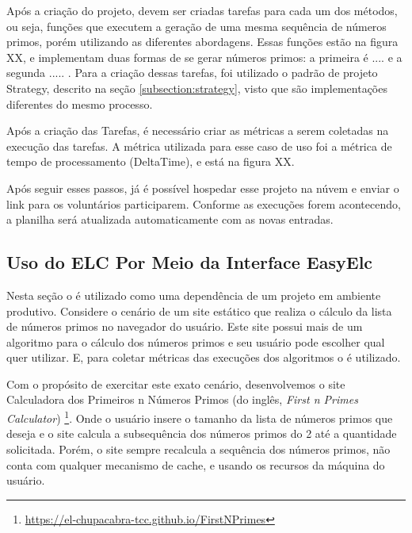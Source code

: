\documentclass[12pt]{tcc}
\begin{document}
Após a criação do projeto, devem ser criadas tarefas para cada um dos métodos, ou seja, funções que executem a geração de uma mesma sequência de números primos, porém utilizando as diferentes abordagens. Essas funções estão na figura XX, e implementam duas formas de se gerar números primos: a primeira é ....  e a segunda ..... . Para a criação dessas tarefas, foi utilizado o padrão de projeto Strategy, descrito na seção \ref{subsection:strategy}, visto que são implementações diferentes do mesmo processo.

Após a criação das Tarefas, é necessário criar as métricas a serem coletadas na execução das tarefas. A métrica utilizada para esse caso de uso foi a métrica de tempo de processamento (DeltaTime), e está na figura XX.

Após seguir esses passos, já é possível hospedar esse projeto na núvem e enviar o link para os voluntários participarem. Conforme as execuções forem acontecendo, a planilha será atualizada automaticamente com as novas entradas.


\subsection{Uso do ELC Por Meio da Interface EasyElc}
\label{subsection:study-case-easyelc}

Nesta seção o  é utilizado como uma dependência de um projeto em ambiente produtivo.
Considere o cenário de um site estático que realiza o cálculo da lista de números primos no navegador do usuário.
Este site possui mais de um algoritmo para o cálculo dos números primos e seu usuário pode escolher qual quer utilizar.
E, para coletar métricas das execuções dos algoritmos o  é utilizado.


Com o propósito de exercitar este exato cenário, desenvolvemos o site Calculadora dos Primeiros n Números Primos (do inglês, \emph{First n Primes Calculator})
\footnote{\url{https://el-chupacabra-tcc.github.io/FirstNPrimes}}.
Onde o usuário insere o tamanho da lista de números primos que deseja e o site calcula a subsequência dos números primos do 2 até a quantidade solicitada.
Porém, o site sempre recalcula a sequência dos números primos, não conta com qualquer mecanismo de cache, e usando os recursos da máquina do usuário.
\end{document}
